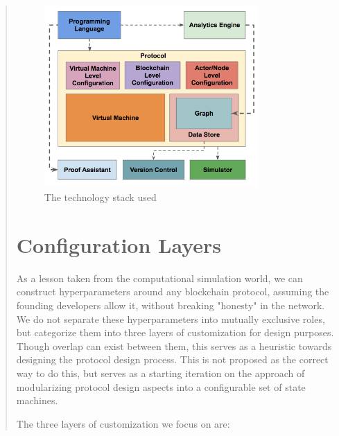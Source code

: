 \documentclass[12pt, titlepage, twocolumn]{report}
\begin{document}
\begin{quotation}
\begin{figure}[ht]
\centering
	\includegraphics[width=0.8\textwidth]{k_architecture}
	\caption{The technology stack used}
	\label{k_architecture}
\end{figure}

\section{Configuration Layers}
As a lesson taken from the computational simulation world, we can construct hyperparameters around any blockchain protocol, assuming the founding developers allow it, without breaking "honesty" in the network. We do not separate these hyperparameters into mutually exclusive roles, but categorize them into three layers of customization for design purposes. Though overlap can exist between them, this serves as a heuristic towards designing the protocol design process. This is not proposed as the correct way to do this, but serves as a starting iteration on the approach of modularizing protocol design aspects into a configurable set of state machines.


The three layers of customization we focus on are:


\end{quotation}
\end{document}
